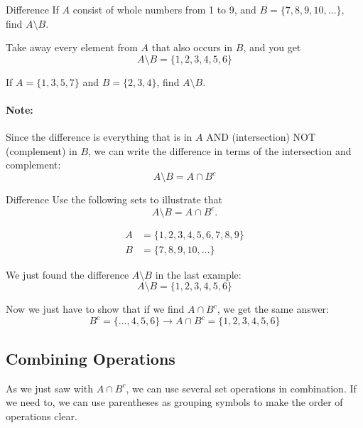 \begin{example}{Difference}
If $A$ consist of whole numbers from 1 to 9, and $B = \{7,8,9,10,\ldots\}$, find $A \setminus B$.

\sol
Take away every element from $A$ that also occurs in $B$, and you get
\[\boxed{A \setminus B = \{1,2,3,4,5,6\}}\]
\end{example}

\begin{try}
If $A=\{1,3,5,7\}$ and $B=\{2,3,4\}$, find $A \setminus B$.
\end{try}

\paragraph{Note:} Since the difference is everything that is in $A$ AND (intersection) NOT (complement) in $B$, we can write the difference in terms of the intersection and complement:
\[A \setminus B = A \cap B^c\]
\pagebreak

\begin{example}{Difference}
Use the following sets to illustrate that \[A \setminus B = A \cap B^c.\]

\begin{align*}
A &= \{1,2,3,4,5,6,7,8,9\}\\
B &= \{7,8,9,10,\ldots\}
\end{align*}

\sol
We just found the difference $A \setminus B$ in the last example:
\[A \setminus B = \{1,2,3,4,5,6\}\]

Now we just have to show that if we find $A \cap B^c$, we get the same answer:
\[B^c = \{\ldots, 4,5,6\} \longrightarrow A \cap B^c = \{1,2,3,4,5,6\}\]

\end{example}

\subsection{Combining Operations}
As we just saw with $A \cap B^c$, we can use several set operations in combination.  If we need to, we can use parentheses as grouping symbols to make the order of operations clear.


